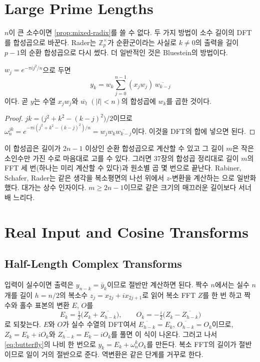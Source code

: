 \section{Large Prime Lengths}
\label{sec:prime-length}

$n$이 큰 소수이면 \cref{prop:mixed-radix}를 쓸 수 없다. 두 가지 방법이 소수 길이의 DFT를 합성곱으로 바꾼다. Rader는 $\mathbb Z_p^\times$가 순환군이라는 사실로 $k\ne0$의 출력을 길이 $p-1$의 순환 합성곱으로 다시 썼다\cite{rader1968}. 더 일반적인 것은 Bluestein의 방법이다.

\begin{proposition}[Bluestein]
\label{prop:bluestein}
$w_j=e^{-\pi ij^2/n}$으로 두면
\[
y_k=w_k\sum_{j=0}^{n-1}(x_jw_j)\,\overline{w_{k-j}}
\]
이다. 곧 $y$는 수열 $x_jw_j$와 $\overline{w_l}$ $(|l|<n)$의 합성곱에 $w_k$를 곱한 것이다.
\end{proposition}

\begin{proof}
$jk=\bigl(j^2+k^2-(k-j)^2\bigr)/2$이므로 $\omega_n^{jk}=e^{-\pi i(j^2+k^2-(k-j)^2)/n}=w_jw_k\overline{w_{k-j}}$이다. 이것을 DFT의 합에 넣으면 된다.
\end{proof}

이 합성곱은 길이가 $2n-1$ 이상인 순환 합성곱으로 계산할 수 있고 그 길이 $m$은 작은 소인수만 가진 수로 마음대로 고를 수 있다. 그러면 37장의 합성곱 정리대로 길이 $m$의 FFT 세 번(하나는 미리 계산할 수 있다)과 원소별 곱 몇 번으로 끝난다. Rabiner, Schafer, Rader는 같은 생각을 복소평면의 나선 위에서 $z$-변환을 계산하는 으로 일반화했다\cite{bluestein1970,rabiner1969chirpz}. 대가는 상수 인자이다. $m\ge2n-1$이므로 같은 크기의 매끄러운 길이보다 서너 배 느리다.

\section{Real Input and Cosine Transforms}
\label{sec:real-fft}

\subsection{Half-Length Complex Transforms}

입력이 실수이면 출력은 $y_{n-k}=\bar y_k$이므로 절반만 계산하면 된다. 짝수 $n$에서는 실수 $n$개를 길이 $h=n/2$의 복소수 $z_j=x_{2j}+ix_{2j+1}$로 읽어 복소 FFT $Z$를 한 번 하고 짝수와 홀수 표본의 변환 $E$, $O$를
\[
E_k=\tfrac12\bigl(Z_k+\overline{Z_{h-k}}\bigr),\qquad O_k=-\tfrac i2\bigl(Z_k-\overline{Z_{h-k}}\bigr)
\]
로 되찾는다. $E$와 $O$가 실수 수열의 DFT여서 $\overline{E_{h-k}}=E_k$, $\overline{O_{h-k}}=O_k$이므로, $Z_k=E_k+iO_k$와 $\overline{Z_{h-k}}=E_k-iO_k$를 풀면 이 식이 나온다. 그러고 나서 \eqref{eq:butterfly}의 나비 한 번으로 $y_k=E_k+\omega_n^kO_k$를 만든다. 복소 FFT의 길이가 절반이므로 일이 거의 절반으로 준다. 역변환은 같은 단계를 거꾸로 한다.

